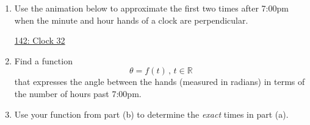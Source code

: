 \documentclass{ximera}
\begin{document}
\begin{question} \label{Qdgbhyy7777}
\begin{enumerate} 
\item Use the animation below to approximate the first two times after 7:00pm when the minute and hour hands of a clock are perpendicular.

\begin{onlineOnly}
    \begin{center}
\end{center}
\end{onlineOnly}

\href{https://www.desmos.com/calculator/rdqfuflcmq}{142: Clock 32}


\item Find a function 
\[
  \theta = f(t) \, , \, t\in \mathbb{R}
\]
that expresses the angle between the hands (measured in radians) in terms of the number of hours past 7:00pm.

\item Use your function from part (b) to determine the \emph{exact} times in part (a).
\end{enumerate}

\end{question}
\end{document}
